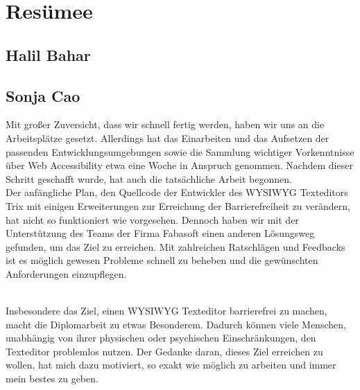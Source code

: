 \chapter{Resümee}
\section{Halil Bahar}

\section{Sonja Cao}
Mit großer Zuversicht, dass wir schnell fertig werden, haben wir uns an die Arbeitsplätze gesetzt. Allerdings hat das Einarbeiten und das Aufsetzen der passenden Entwicklungsumgebungen sowie die Sammlung wichtiger Vorkenntnisse über Web Accessibility etwa eine Woche in Anspruch genommen. Nachdem dieser Schritt geschafft wurde, hat auch die tatsächliche Arbeit begonnen. \\
Der anfängliche Plan, den Quellcode der Entwickler des WYSIWYG Texteditors Trix mit einigen Erweiterungen zur Erreichung der Barrierefreiheit zu verändern, hat nicht so funktioniert wie vorgesehen. Dennoch haben wir mit der Unterstützung des Teams der Firma Fabasoft einen anderen Lösungsweg gefunden, um das Ziel zu erreichen. Mit zahlreichen Ratschlägen und Feedbacks ist es möglich gewesen Probleme schnell zu beheben und die gewünschten Anforderungen einzupflegen. 

\mbox{}\\
Insbesondere das Ziel, einen WYSIWYG Texteditor barrierefrei zu machen, macht die Diplomarbeit zu etwas Besonderem. Dadurch können viele Menschen, unabhängig von ihrer physischen oder psychischen Einschränkungen, den Texteditor problemlos nutzen. Der Gedanke daran, dieses Ziel erreichen zu wollen, hat mich dazu motiviert, so exakt wie möglich zu arbeiten und immer mein bestes zu geben. 